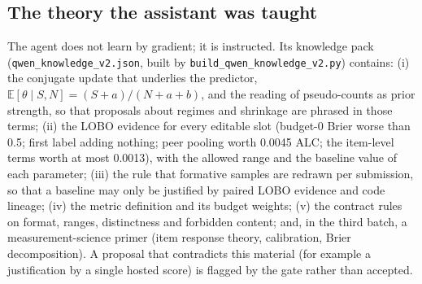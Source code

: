 \documentclass{article}
\begin{document}
\subsection{The theory the assistant was taught}
The agent does not learn by gradient; it is instructed. Its knowledge pack (\texttt{qwen\_knowledge\_v2.json}, built by \texttt{build\_qwen\_knowledge\_v2.py}) contains: (i) the conjugate update that underlies the predictor, $\mathbb{E}[\theta\mid S,N]=(S+a)/(N+a+b)$, and the reading of pseudo-counts as prior strength, so that proposals about regimes and shrinkage are phrased in those terms; (ii) the LOBO evidence for every editable slot (budget-0 Brier worse than 0.5; first label adding nothing; peer pooling worth 0.0045 ALC; the item-level terms worth at most 0.0013), with the allowed range and the baseline value of each parameter; (iii) the rule that formative samples are redrawn per submission, so that a baseline may only be justified by paired LOBO evidence and code lineage; (iv) the metric definition and its budget weights; (v) the contract rules on format, ranges, distinctness and forbidden content; and, in the third batch, a measurement-science primer (item response theory, calibration, Brier decomposition). A proposal that contradicts this material (for example a justification by a single hosted score) is flagged by the gate rather than accepted.
\end{document}
